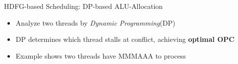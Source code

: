 \documentclass{beamer}
\begin{document}
\begin{CJK}{UTF8}{bkai}
            \begin{frame}{HDFG-based Scheduling: DP-based ALU-Allocation}
                \begin{itemize}
                    \pause
                    \item {Analyze two threads by \textit{Dynamic Programming}\footnotemark (DP)}
                    \pause
                    \item {DP determines which thread stalls at conflict, achieving \textbf{optimal OPC}}
                    \pause
                    \item {Example shows two threads have MMMAAA to process}
                \end{itemize}
                    \setcounter{subfigure}{0}
                    \pause
                    \vspace{-1em}
                    \begin{figure}[!ht]
                        \begin{center}
                            \hfill
                            \hfill
\end{center}
\end{figure}
\end{frame}
\end{CJK}
\end{document}
